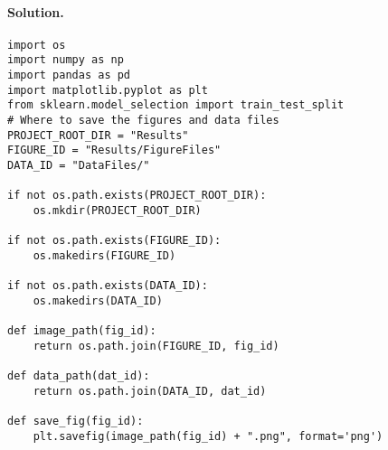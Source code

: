 \documentclass[%
oneside,                 %
final,                   %
10pt]{article}
\newenvironment{doconceexercise}{}{}
\begin{document}
\begin{doconceexercise}
\paragraph{Solution.}

































































\begin{verbatim}
import os
import numpy as np
import pandas as pd
import matplotlib.pyplot as plt
from sklearn.model_selection import train_test_split
# Where to save the figures and data files
PROJECT_ROOT_DIR = "Results"
FIGURE_ID = "Results/FigureFiles"
DATA_ID = "DataFiles/"

if not os.path.exists(PROJECT_ROOT_DIR):
    os.mkdir(PROJECT_ROOT_DIR)

if not os.path.exists(FIGURE_ID):
    os.makedirs(FIGURE_ID)

if not os.path.exists(DATA_ID):
    os.makedirs(DATA_ID)

def image_path(fig_id):
    return os.path.join(FIGURE_ID, fig_id)

def data_path(dat_id):
    return os.path.join(DATA_ID, dat_id)

def save_fig(fig_id):
    plt.savefig(image_path(fig_id) + ".png", format='png')


\end{verbatim}
\end{doconceexercise}
\end{document}
